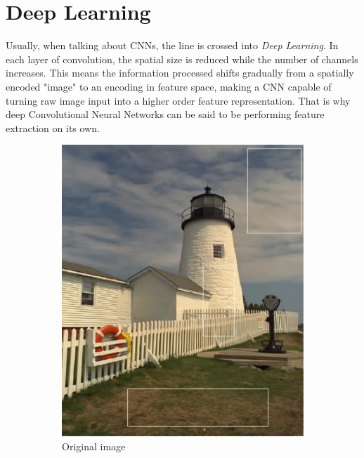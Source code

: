 \section{Deep Learning}
Usually, when talking about CNNs, the line is crossed into \textit{Deep Learning}. In each layer of convolution, the spatial size is reduced while the number of channels increases. This means the information processed shifts gradually from a spatially encoded "image" to an encoding in feature space, making a CNN capable of turning raw image input into a higher order feature representation. That is why deep Convolutional Neural Networks can be said to be performing feature extraction on its own.

\begin{figure}
    \begin{subfigure}[ht]{0.49\linewidth}
        \includegraphics[width=\linewidth]{Chapters/2.Background/figures/original.png}
        \caption{Original image}
    \end{subfigure}
    \hfill
    \begin{subfigure}[ht]{0.49\linewidth}

\end{subfigure}
\end{figure}
